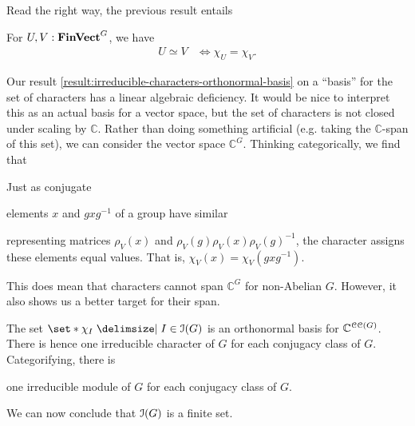 \pan Read the right way, the previous result entails
\begin{theorem}
\label{result:character-equality-decategorifies}
  \pan For $U, V : \operatorname{\mathbf{FinVect}}^G$, we have
  \begin{align*}
    U \simeq V
    &\iff \chi_U = \chi_V
    .
  \end{align*}
\end{theorem}
\par Our result \ref{result:irreducible-characters-orthonormal-basis} on a ``basis'' for the set of characters has a linear algebraic deficiency. It would be nice to interpret this as an actual basis for a vector space, but the set of characters is not closed under scaling by $\mathbb{C}$. Rather than doing something artificial (e.g. taking the $\mathbb{C}$-span of this set), we can consider the vector space $\mathbb{C}^G$. Thinking categorically, we find that
\begin{lemma}
\label{result:characters-class-functions}
  \pan Just as conjugate  elements $x$ and $g x g^{-1}$ of a group have similar  representing matrices $\rho_V (x)$ and $\rho_V (g) \rho_V (x) \rho_V (g)^{-1}$, the character assigns these elements equal values. That is, $\chi_V (x) = \chi_V (g x g^{-1})$. 
\end{lemma}
\par This does mean that characters cannot span $\mathbb{C}^G$ for non-Abelian $G$. However, it also shows us a better target for their span.
\begin{theorem}
\label{result:irreducible-characters-orthonormal-basis}
  \pan The set $\set*{ \chi_I \given I \in \Irred(G) }$ is an orthonormal basis for $\mathbb{C}^{\operatorname{\mathcal{CC}}(G)}$. There is hence one irreducible character of $G$ for each conjugacy class of $G$. Categorifying, there is  one irreducible module of $G$ for each conjugacy class of $G$.
\end{theorem}
\pan We can now conclude that $\operatorname{\mathcal{I}}(G)$ is a finite set.

